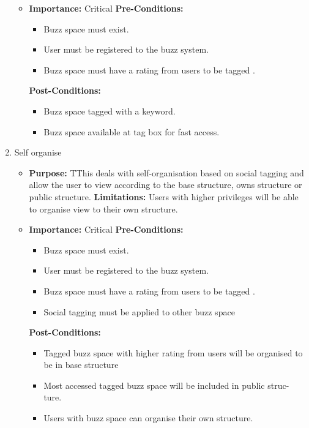 \documentclass[11pt]{article}
\begin{document}
\begin{enumerate}
\begin{itemize}
\item \textbf{Importance:} Critical\newline
\textbf{Pre-Conditions: }
	\begin{itemize}
	\item Buzz space must exist.
	\item User must be registered to the buzz system.
	\item Buzz space must have a rating from users to be tagged .
	\end{itemize}

\textbf{Post-Conditions: }
	\begin{itemize}
	\item Buzz space tagged with a keyword.
	\item Buzz space available at tag box for fast access.
	\end{itemize}
\end{itemize}

\item Self organise
\begin{itemize}
\item \textbf{Purpose:}
TThis deals with self-organisation based on social tagging and
allow the user to view according to the base structure, owns structure
or public structure.
\newline
\textbf{Limitations:} 
Users with higher privileges will be able to
organise view to their own structure.

\item \textbf{Importance:} Critical\newline
\textbf{Pre-Conditions: }
	\begin{itemize}
	\item Buzz space must exist.
	\item User must be registered to the buzz system.
	\item Buzz space must have a rating from users to be tagged .
	\item Social tagging must be applied to other buzz space
	\end{itemize}

\textbf{Post-Conditions: }
	\begin{itemize}
	\item Tagged buzz space with higher rating from users will be organised
to be in base structure
	\item Most accessed tagged buzz space will be included in public struc-
ture.
	\item Users with buzz space can organise their own structure.
	\end{itemize}
\end{itemize}


\end{enumerate}
\end{document}
